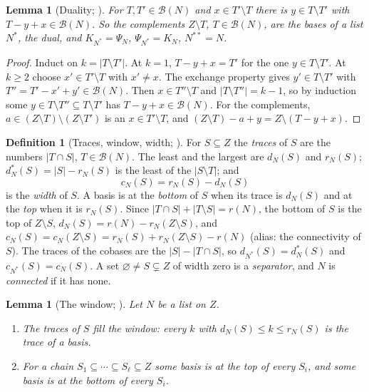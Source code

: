 \documentclass[11pt]{article}
\theoremstyle{plain}
\newtheorem{lemma}[prop]{Lemma}
\theoremstyle{definition}
\newtheorem{defn}[prop]{Definition}
\theoremstyle{remark}
\newcommand{\cB}{\mathcal B}
\begin{document}
\begin{lemma}[Duality; {\cite[Def.~7.1, Prop.~7.2, p.~48]{F}}]\label{lem:dual}
For $T,T'\in\cB(N)$ and $x\in T'\setminus T$ there is $y\in T\setminus T'$ with $T-y+x\in\cB(N)$. So the complements $Z\setminus T$, $T\in\cB(N)$, are the bases of a list $N^\ast$, the \emph{dual}, and $K_{N^\ast}=\Psi_N$, $\Psi_{N^\ast}=K_N$, $N^{\ast\ast}=N$.
\end{lemma}

\begin{proof}
Induct on $k=|T\setminus T'|$. At $k=1$, $T-y+x=T'$ for the one $y\in T\setminus T'$. At $k\ge2$ choose $x'\in T'\setminus T$ with $x'\neq x$. The exchange property gives $y'\in T\setminus T'$ with $T''=T'-x'+y'\in\cB(N)$. Then $x\in T''\setminus T$ and $|T\setminus T''|=k-1$, so by induction some $y\in T\setminus T''\subseteq T\setminus T'$ has $T-y+x\in\cB(N)$. For the complements, $a\in(Z\setminus T)\setminus(Z\setminus T')$ is an $x\in T'\setminus T$, and $(Z\setminus T)-a+y=Z\setminus(T-y+x)$.
\end{proof}

\begin{defn}[Traces, window, width; {\cite[Def.~7.10, Thm.~7.11, p.~49]{F}}]\label{def:window}
For $S\subseteq Z$ the \emph{traces} of $S$ are the numbers $|T\cap S|$, $T\in\cB(N)$. The least and the largest are $d_N(S)$ and $r_N(S)$; $d^\ast_N(S)=|S|-r_N(S)$ is the least of the $|S\setminus T|$; and
\[
c_N(S)=r_N(S)-d_N(S)
\]
is the \emph{width} of $S$. A basis is at the \emph{bottom} of $S$ when its trace is $d_N(S)$ and at the \emph{top} when it is $r_N(S)$. Since $|T\cap S|+|T\setminus S|=r(N)$, the bottom of $S$ is the top of $Z\setminus S$, $d_N(S)=r(N)-r_N(Z\setminus S)$, and $c_N(S)=c_N(Z\setminus S)=r_N(S)+r_N(Z\setminus S)-r(N)$ (alias: the connectivity of $S$). The traces of the cobases are the $|S|-|T\cap S|$, so $d_{N^\ast}(S)=d^\ast_N(S)$ and $c_{N^\ast}(S)=c_N(S)$. A set $\varnothing\neq S\subsetneq Z$ of width zero is a \emph{separator}, and $N$ is \emph{connected} if it has none.
\end{defn}

\begin{lemma}[The window; {\cite[Thm.~7.11, p.~49; Lemma~8.5, p.~55]{F}}]\label{lem:window}
Let $N$ be a list on $Z$.
\begin{enumerate}[label=(\roman*)]
\item The traces of $S$ fill the window: every $k$ with $d_N(S)\le k\le r_N(S)$ is the trace of a basis.
\item For a chain $S_1\subseteq\cdots\subseteq S_\ell\subseteq Z$ some basis is at the top of every $S_i$, and some basis is at the bottom of every $S_i$.
\end{enumerate}
\end{lemma}
\end{document}
